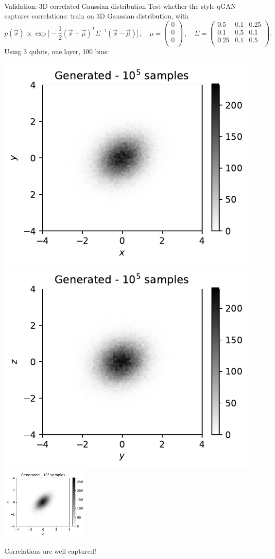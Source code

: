 \documentclass[11pt,aspectratio=169]{beamer}
\begin{document}
\begin{frame}{Validation: 3D correlated Gaussian distribution}
    Test whether the style-qGAN captures correlations: train on 3D Gaussian distribution, with
    \begin{equation*}
        p(\vec{x}) \propto \exp \Big[ - \frac{1}{2} (\vec{x} - \vec{\mu})^T
        \Sigma^{-1} (\vec{x} - \vec{\mu}) \Big] \,, \quad
        \mu =
\begin{pmatrix}
  0 \\
  0 \\
  0 \\
  \end{pmatrix}\,, \quad
        \Sigma =
\begin{pmatrix}
  0.5 & 0.1 & 0.25\\
  0.1 & 0.5 & 0.1\\
  0.25 & 0.1 & 0.5\\
  \end{pmatrix}.
    \end{equation*}
    Using 3 qubits, one layer, 100 bins:
    \begin{multicols*}{3}
        \includegraphics[width=0.33 \textwidth]{figures/plots/3Dgaussian_posdef/1-2_FAKE_100k.pdf}
        \includegraphics[width=0.33 \textwidth]{figures/plots/3Dgaussian_posdef/2-3_FAKE_100k.pdf}
        \includegraphics[width=0.33\textwidth]{figures/plots/3Dgaussian_posdef/3-1_FAKE_100k.pdf}
    \end{multicols*}
    \centering
    Correlations are well captured!
\end{frame}
\end{document}
